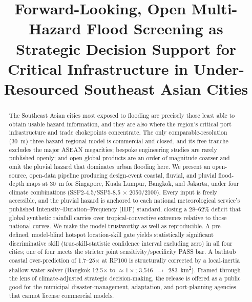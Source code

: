 \documentclass[conference]{IEEEtran}
\begin{document}
\title{Forward-Looking, Open Multi-Hazard Flood Screening as Strategic Decision Support for Critical Infrastructure in Under-Resourced Southeast Asian Cities}

\author{
}

\maketitle

\begin{abstract}
The Southeast Asian cities most exposed to flooding are precisely those least able to obtain usable hazard information, and they are also where the region's critical port infrastructure and trade chokepoints concentrate. The only comparable-resolution (30~m) three-hazard regional model is commercial and closed, and its free tranche excludes the major ASEAN megacities; bespoke engineering studies are rarely published openly; and open global products are an order of magnitude coarser and omit the pluvial hazard that dominates urban flooding here. We present an open-source, open-data pipeline producing design-event coastal, fluvial, and pluvial flood-depth maps at 30~m for Singapore, Kuala Lumpur, Bangkok, and Jakarta, under four climate combinations (SSP2-4.5/SSP5-8.5 $\times$ 2050/2100). Every input is freely accessible, and the pluvial hazard is anchored to each national meteorological service's published Intensity--Duration--Frequency (IDF) standard, closing a 28--62\% deficit that global synthetic rainfall carries over tropical-convective extremes relative to those national curves. We make the model trustworthy as well as reproducible. A pre-defined, model-blind hotspot location-skill gate yields statistically significant discriminative skill (true-skill-statistic confidence interval excluding zero) in all four cities; one of four meets the stricter joint sensitivity/specificity PASS bar. A bathtub coastal over-prediction of 1.7--25$\times$ at RP100 is structurally corrected by a local-inertia shallow-water solver (Bangkok 12.5$\times$ to ${\approx}1\times$; 3{,}546~$\rightarrow$~283~km\textsuperscript{2}). Framed through the lens of climate-adjusted strategic decision-making, the release is offered as a public good for the municipal disaster-management, adaptation, and port-planning agencies that cannot license commercial models.
\end{abstract}
\end{document}
